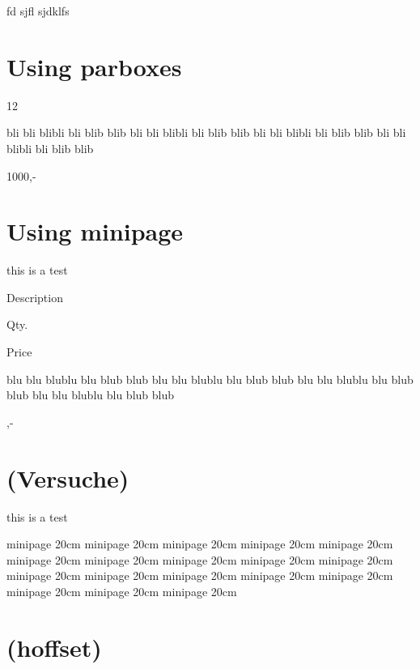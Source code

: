 \documentclass[a4paper]{report}
\begin{document}
fd sjfl sjdklfs


\section*{Using parboxes}

\parbox[][][s]{1.2cm}{
12
}
\parbox[b][][t]{3cm}{
bli bli blibli bli blib blib
bli bli blibli bli blib blib
bli bli blibli bli blib blib
bli bli blibli bli blib blib
}
\parbox[][][b]{1.2cm}{
1000,-
}


\section*{Using minipage}

this is a test

\begin{minipage}[b]{3cm}
Description
\end{minipage}
\begin{minipage}{1.2cm}\raggedleft
Qty.
\end{minipage}
\begin{minipage}{2cm}\raggedleft
Price
\end{minipage}

\begin{minipage}[b]{3cm}
blu blu blublu blu blub blub
blu blu blublu blu blub blub
blu blu blublu blu blub blub
blu blu blublu blu blub blub
\end{minipage}
\begin{minipage}{1.2cm}
\end{minipage}
\begin{minipage}{2cm},-
\end{minipage}



\section*{(Versuche)}

this is a test

\hspace{-5cm}
\begin{minipage}[b]{20cm}
minipage 20cm
minipage 20cm
minipage 20cm
minipage 20cm
minipage 20cm
minipage 20cm
minipage 20cm
minipage 20cm
minipage 20cm
minipage 20cm
minipage 20cm
minipage 20cm
minipage 20cm
minipage 20cm
minipage 20cm
minipage 20cm
minipage 20cm
minipage 20cm
\end{minipage}


\section*{(hoffset)}
\end{document}
